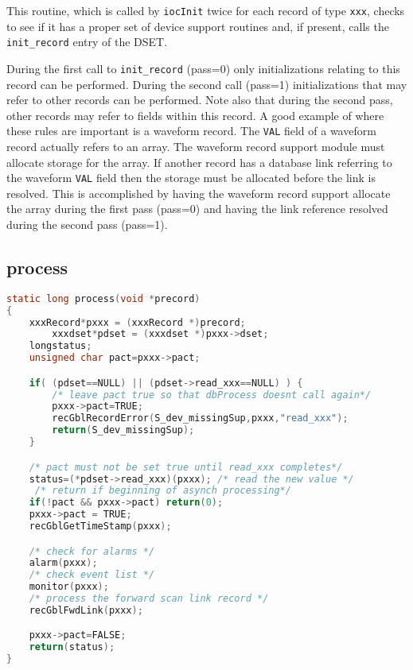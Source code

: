 This routine, which is called by \verb|iocInit| twice for each record of type \verb|xxx|, checks to see if it has a proper set of device support routines and, if present, calls the \verb|init_record| entry of the DSET.

During the first call to \verb|init_record| (pass=0) only initializations relating to this record can be performed.
During the second call (pass=1) initializations that may refer to other records can be performed.
Note also that during the second pass, other records may refer to fields within this record.
A good example of where these rules are important is a waveform record.
The \verb|VAL| field of a waveform record actually refers to an array.
The waveform record support module must allocate storage for the array.
If another record has a database link referring to the waveform \verb|VAL| field then the storage must be allocated before the link is resolved.
This is accomplished by having the waveform record support allocate the array during the first pass (pass=0) and having the link reference resolved during the second pass (pass=1).

\subsection{process}

\begin{lstlisting}[language=C]
static long process(void *precord)
{
    xxxRecord*pxxx = (xxxRecord *)precord;
        xxxdset*pdset = (xxxdset *)pxxx->dset;
    longstatus;
    unsigned char pact=pxxx->pact;

    if( (pdset==NULL) || (pdset->read_xxx==NULL) ) {
        /* leave pact true so that dbProcess doesnt call again*/
        pxxx->pact=TRUE;
        recGblRecordError(S_dev_missingSup,pxxx,"read_xxx");
        return(S_dev_missingSup);
    }

    /* pact must not be set true until read_xxx completes*/
    status=(*pdset->read_xxx)(pxxx); /* read the new value */
     /* return if beginning of asynch processing*/
    if(!pact && pxxx->pact) return(0);
    pxxx->pact = TRUE;
    recGblGetTimeStamp(pxxx);

    /* check for alarms */
    alarm(pxxx);
    /* check event list */
    monitor(pxxx);
    /* process the forward scan link record */
    recGblFwdLink(pxxx);

    pxxx->pact=FALSE;
    return(status);
}
\end{lstlisting}


